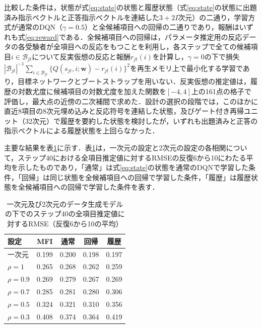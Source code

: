 \documentclass[paper]{ieicej}
\begin{document}
比較した条件は，状態が式\eqref{eq:state}の状態と履歴状態（式\eqref{eq:state}の状態に出題済み指示ベクトルと正答指示ベクトルを連結した$3+2I$次元）の二通り，学習方式が通常のDQN（$\gamma=0.5$）と全候補項目への回帰の二通りであり，報酬はいずれも式\eqref{eq:reward}である．全候補項目への回帰は，パラメータ推定用の反応データの各受験者が全項目への反応をもつことを利用し，各ステップで全ての候補項目$i\in\mathcal{B}_{jt}$について反実仮想の反応と報酬$r_{jt}(i)$を計算し，$\gamma=0$の下で損失$|\mathcal{B}_{jt}|^{-1}\sum_{i\in\mathcal{B}_{jt}}\{Q(s_{jt},i;\bm{w})-r_{jt}(i)\}^2$を再生メモリ上で最小化する学習であり，目標ネットワークとブートストラップを用いない．反実仮想の推定値は，履歴の対数尤度に候補項目の対数尤度を加えた関数を$[-4,4]$上の161点の格子で評価し，最大点の近傍の二次補間で求めた．設計の選択の段階では，このほかに直近8項目の8次元埋め込みと反応符号を連結した状態，及びゲート付き再帰ユニット（32次元）で履歴を要約した状態を検討したが，いずれも出題済みと正答の指示ベクトルによる履歴状態を上回らなかった．

主要な結果を表\ref{tab:app-mirt}に示す．表\ref{tab:app-mirt}は，一次元の設定と2次元の設定の各相関について，ステップ40における全項目推定値に対するRMSEの反復6から10にわたる平均を示したものであり，「通常」は式\eqref{eq:state}の状態を通常のDQNで学習した条件，「回帰」は同じ状態を全候補項目への回帰で学習した条件，「履歴」は履歴状態を全候補項目への回帰で学習した条件を表す．

\begin{table}[t]
\centering
\caption{一次元及び2次元のデータ生成モデルの下でのステップ40の全項目推定値に対するRMSE（反復6から10の平均）}
\label{tab:app-mirt}
\footnotesize
\setlength{\tabcolsep}{4pt}
\begin{tabular}{lcccc}
\hline
設定 & MFI & 通常 & 回帰 & 履歴\\
\hline
一次元 & 0.199 & 0.200 & 0.198 & 0.197\\
$\rho=1$ & 0.265 & 0.268 & 0.262 & 0.259\\
$\rho=0.9$ & 0.269 & 0.279 & 0.267 & 0.269\\
$\rho=0.7$ & 0.285 & 0.281 & 0.280 & 0.306\\
$\rho=0.5$ & 0.324 & 0.321 & 0.310 & 0.356\\
$\rho=0.3$ & 0.408 & 0.374 & 0.364 & 0.419\\
\hline
\end{tabular}
\end{table}
\end{document}
